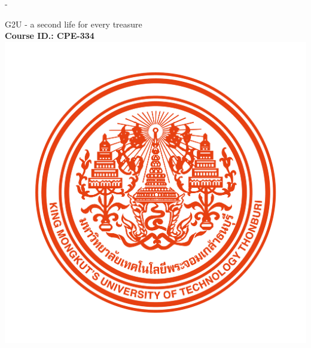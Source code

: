 \begin{titlingpage}
	\begin{SingleSpace}
		\calccentering{\unitlength}
		\begin{adjustwidth*}{\unitlength}{-\unitlength}
			\begin{center}
				{\HUGE G2U - a second life for every treasure}\\[4mm]
				\vspace{3mm}
				{\large \textbf{Course ID.: CPE-334}}\\
				\vspace{12mm}
				\includegraphics[scale=0.25]{frontmatter/KMUTT_CI.png} \\[0.25cm]
				\vspace{12mm}

\end{center}
\end{adjustwidth*}
\end{SingleSpace}
\end{titlingpage}
